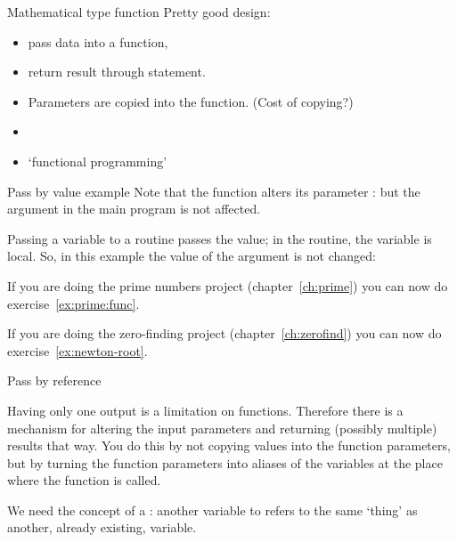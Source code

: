 \begin{slide}{Mathematical type function}
  \label{sl:func-functional}
  Pretty good design:
  \begin{itemize}
  \item pass data into a function,
  \item return result through  statement.
  \item Parameters are copied into the function. (Cost of copying?)
  \item {}
  \item `functional programming'
  \end{itemize}
\end{slide}

\begin{slide}{Pass by value example}
  \label{sl:func-functional-ex}
  Note that the function alters its parameter :
  but the argument in the main program is not affected.
\end{slide}

Passing a variable to a routine passes the value; in the routine, the
variable is local. So, in this example
the value of the argument is not changed:


\begin{exercise}
  If you are doing the prime numbers project (chapter~\ref{ch:prime}) you can
  now do exercise~\ref{ex:prime:func}.
\end{exercise}

\begin{exercise}
  If you are doing the zero-finding project (chapter~\ref{ch:zerofind})
  you can now do exercise~\ref{ex:newton-root}.
\end{exercise}

 {Pass by reference}
\label{sec:pass-by-ref}
  
Having only one output is a limitation on functions. Therefore there
is a mechanism for altering the input parameters and returning
(possibly multiple) results that way. You do this by not copying
values into the function parameters, but by turning the function
parameters into aliases of the variables at the place where the
function is called.

We need the concept of a :
another variable to refers to the same `thing' as another,
already existing, variable.

